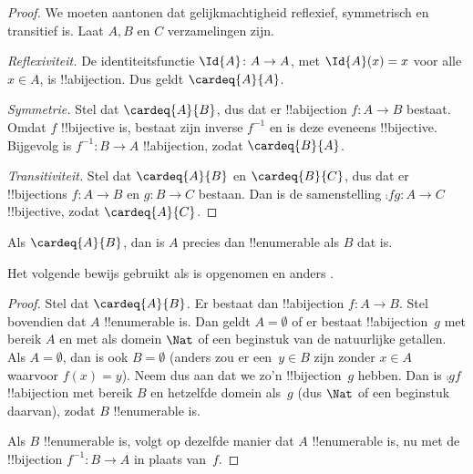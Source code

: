 \documentclass[openany]{memoir}
\begin{document}
\begin{proof} 
We moeten aantonen dat gelijkmachtigheid reflexief, symmetrisch en transitief
is. Laat $A, B$ en $C$ verzamelingen zijn.

\emph{Reflexiviteit.} De identiteitsfunctie $\Id{A} \colon A \to A$, met
$\Id{A} (x) = x$ voor alle $x \in A$, is !!a{bijection}. Dus geldt
$\cardeq{A}{A}$.

\emph{Symmetrie.} Stel dat $\cardeq{A}{B}$, dus dat er !!a{bijection}
$f\colon A \to B$ bestaat. Omdat $f$ !!{bijective} is, bestaat zijn inverse
$f^{-1}$ en is deze eveneens !!{bijective}. Bijgevolg is
$f^{-1}\colon B \to A$ !!a{bijection}, zodat $\cardeq{B}{A}$.

\emph{Transitiviteit.} Stel dat $\cardeq{A}{B}$ en $\cardeq{B}{C}$, dus dat
er !!{bijection}s $f\colon A \to B$ en $g\colon B \to C$ bestaan. Dan is de
samenstelling $\comp{f}{g}\colon A \to C$ !!{bijective}, zodat
$\cardeq{A}{C}$.
\end{proof}

\begin{prop}
Als $\cardeq{A}{B}$, dan is $A$ precies dan !!{enumerable} als $B$ dat is.
\end{prop}

\begin{editorial}
Het volgende bewijs gebruikt  als
 is opgenomen en anders .
\end{editorial}

\begin{proof}
Stel dat $\cardeq{A}{B}$. Er bestaat dan !!a{bijection} $f \colon A
\to B$. Stel bovendien dat $A$ !!{enumerable} is.
{
  Dan geldt $A = \emptyset$ of er bestaat !!a{bijection}~$g$ met bereik
  $A$ en met als domein $\Nat$ of een beginstuk van de natuurlijke getallen. Als
  $A = \emptyset$, dan is ook $B = \emptyset$ (anders zou er een~$y \in B$
  zijn zonder $x \in A$ waarvoor $f(x) = y$). Neem dus aan dat we zo'n
  !!{bijection}~$g$ hebben. Dan is $\comp{g}{f}$ !!a{bijection} met bereik
  $B$ en hetzelfde domein als~$g$ (dus $\Nat$ of een beginstuk daarvan),
  zodat $B$ !!{enumerable} is.}

Als $B$ !!{enumerable} is, volgt op dezelfde manier dat $A$ !!{enumerable}
is, nu met de !!{bijection} $f^{-1}\colon B \to A$ in plaats van~$f$.
\end{proof}
\end{document}
